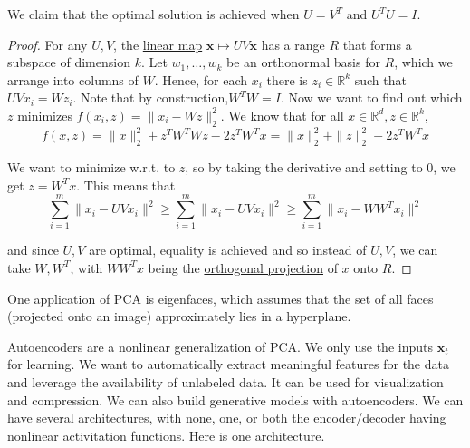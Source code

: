 \documentclass{article}
\begin{document}
  \begin{theorem}
    \label{thm:optimal-linear-autoencoder-is-an-orthogonal}
  We claim that the optimal solution is achieved when $U = V^T$ and $U^T U = I$. 
  \end{theorem}
  \begin{proof}
      For any $U, V$, the \hyperref[lin-def:linear_map]{linear map} $\mathbf{x} \mapsto U V \mathbf{x}$ has a range $R$ that forms a subspace of dimension $k$. Let $w_1, \ldots,w_k$ be an orthonormal basis for $R$, which we arrange into columns of $W$. Hence, for each $x_i$ there is $z_i \in \mathbb{R}^k$ such that $UV x_i = W z_i$. Note that by construction,$W^T W = I$. Now we want to find out which $z$ minimizes $f(x_i, z) = \|x_i - W z\|_2^2$. We know that for all $x \in \mathbb{R}^d, z \in \mathbb{R}^k$, 
  \begin{equation}
    f(x, z) = \|x\|_2^2 + z^T W^T W z - 2 z^T W^T x = \|x\|_2^2 + \|z\|_2^2 - 2 z^T W^T x
  \end{equation}
   
  We want to minimize w.r.t. to $z$, so by taking the derivative and setting to $0$, we get $z = W^T x$. This means that 
  \begin{equation}
    \sum_{i=1}^m \|x_i - U V x_i \|^2 \geq \sum_{i=1}^m \|x_i - UV x_i\|^2 \geq \sum_{i=1}^m \|x_i - W W^T x_i\|^2
  \end{equation}
   
  and since $U, V$ are optimal, equality is achieved and so instead of $U, V$, we can take $W, W^T$, with $W W^T x$ being the \hyperref[lin-def:orthogonal-projection]{orthogonal projection} of $x$ onto $R$. 
  \end{proof}

  One application of PCA is eigenfaces, which assumes that the set of all faces (projected onto an image) approximately lies in a hyperplane. 

  Autoencoders are a nonlinear generalization of PCA. We only use the inputs $\mathbf{x}_t$ for learning. We want to automatically extract meaningful features for the data and leverage the availability of unlabeled data. It can be used for visualization and compression. We can also build generative models with autoencoders. We can have several architectures, with none, one, or both the encoder/decoder having nonlinear activitation functions. Here is one architecture. 
\end{document}
